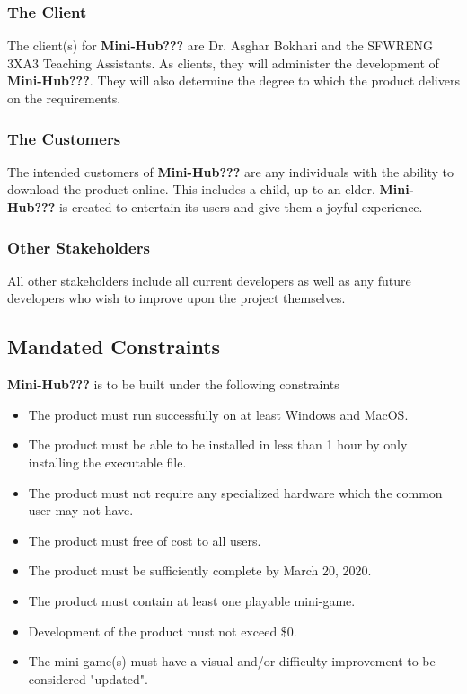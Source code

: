 \documentclass[12pt, titlepage]{article}
\begin{document}
\subsubsection{The Client}

The client(s) for \textbf{Mini-Hub???} are Dr. Asghar Bokhari and the SFWRENG 3XA3 Teaching Assistants. As clients, they will administer the development of \textbf{Mini-Hub???}. They will also determine the degree to which the product delivers on the requirements.

\subsubsection{The Customers}

The intended customers of \textbf{Mini-Hub???} are any individuals with the ability to download the product online. This includes a child, up to an elder. \textbf{Mini-Hub???} is created to entertain its users and give them a joyful experience.

\subsubsection{Other Stakeholders}

All other stakeholders include all current developers as well as any future developers who wish to improve upon the project themselves.

\subsection{Mandated Constraints}

\textbf{Mini-Hub???} is to be built under the following constraints

\begin{itemize}
    \item The product must run successfully on at least Windows and MacOS.
    \item The product must be able to be installed in less than 1 hour by only installing the executable file.
    \item The product must not require any specialized hardware which the common user may not have.
    \item The product must free of cost to all users.
    \item The product must be sufficiently complete by March 20, 2020.
    \item The product must contain at least one playable mini-game.
    \item Development of the product must not exceed \$0.
    \item The mini-game(s) must have a visual and/or difficulty improvement to be considered "updated".
\end{itemize}
\end{document}
